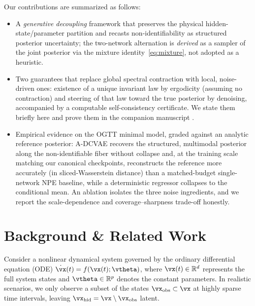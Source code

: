 \documentclass{article} %
\begin{document}
Our contributions are summarized as follows:
\begin{itemize}
    \item A \emph{generative decoupling} framework that preserves the physical hidden-state/parameter partition and recasts non-identifiability as structured posterior uncertainty; the two-network alternation is \emph{derived} as a sampler of the joint posterior via the mixture identity~\eqref{eq:mixture}, not adopted as a heuristic.
    \item Two guarantees that replace global spectral contraction with local, noise-driven ones: existence of a unique invariant law by ergodicity (assuming no contraction) and steering of that law toward the true posterior by denoising, accompanied by a computable self-consistency certificate. We state them briefly here and prove them in the companion manuscript \citep{adcvae-theory}.
    \item Empirical evidence on the OGTT minimal model, graded against an analytic reference posterior: A-DCVAE recovers the structured, multimodal posterior along the non-identifiable fiber without collapse and, at the training scale matching our canonical checkpoints, reconstructs the reference more accurately (in sliced-Wasserstein distance) than a matched-budget single-network NPE baseline, while a deterministic regressor collapses to the conditional mean. An ablation isolates the three noise ingredients, and we report the scale-dependence and coverage--sharpness trade-off honestly.
\end{itemize}

\section{Background \& Related Work}
\label{sec:background}
Consider a nonlinear dynamical system governed by the ordinary differential equation (ODE) $\dot{\vx}(t) = f(\vx(t); \vtheta)$, where $\vx(t) \in \mathbb{R}^d$ represents the full system states and $\vtheta \in \mathbb{R}^p$ denotes the constant parameters. In realistic scenarios, we only observe a subset of the states $\vx_{\mathrm{obs}} \subset \vx$ at highly sparse time intervals, leaving $\vx_{\mathrm{hid}} = \vx \setminus \vx_{\mathrm{obs}}$ latent.
\end{document}
